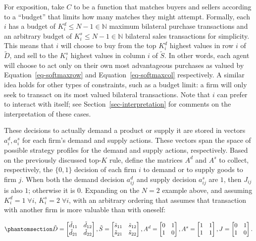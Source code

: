 \documentclass[
]{article}
\theoremstyle{definition}
\theoremstyle{plain}
\theoremstyle{remark}
\begin{document}
For exposition, take \(C\) to be a function that matches buyers and
sellers according to a ``budget'' that limits how many matches they
might attempt. Formally, each \(i\) has a budget of
\(K_i^d \leq N-1 \in \mathbb{N}\) maximum bilateral purchase
transactions and an arbitrary budget of
\(K_i^s \leq N-1 \in \mathbb{N}\) bilateral sales transactions for
simplicity. This means that \(i\) will choose to buy from the top
\(K_i^d\) highest values in row \(i\) of \(\tilde{D}\), and sell to the
\(K_i^s\) highest values in column \(i\) of \(\tilde{S}\). In other
words, each agent will choose to act only on their own most advantageous
purchases as valued by Equation~\ref{eq-softmaxrow} and
Equation~\ref{eq-softmaxcol} respectively. A similar idea holds for
other types of constraints, such as a budget limit: a firm will only
seek to transact on its most valued bilateral transactions. Note that
\(i\) can prefer to interact with itself; see
Section~\ref{sec-interpretation} for comments on the interpretation of
these cases.

These decisions to actually demand a product or supply it are stored in
vectors \(a_i^d, a_i^s\) for each firm's demand and supply actions.
These vectors span the space of possible strategy profiles for the
demand and supply actions, respectively. Based on the previously
discussed top-\(K\) rule, define the matrices \(A^d\) and \(A^s\) to
collect, respectively, the \(\{0, 1\}\) decision of each firm \(i\) to
demand or to supply goods to firm \(j\). When both the demand decision
\(a_{ij}^d\) and supply decision \(a_{ij}^s\) are \(1\), then \(J_{ij}\)
is also \(1\); otherwise it is \(0\). Expanding on the \(N=2\) example
above, and assuming \(K_i^d=1 \; \forall i\), \(K_i^s=2 \; \forall i\),
with an arbitrary ordering that assumes that transaction with another
firm is more valuable than with oneself:

\begin{equation}\phantomsection\label{eq-ntwoexample}{
\tilde{D} = 
\begin{bmatrix}
\tilde{d}_{11} & \tilde{d}_{12} \\
\tilde{d}_{21} & \tilde{d}_{22}
\end{bmatrix}
,
\tilde{S} = 
\begin{bmatrix}
\tilde{s}_{11} & \tilde{s}_{12} \\
\tilde{s}_{21} & \tilde{s}_{22}
\end{bmatrix}
,
A^d = 
\begin{bmatrix}
0 & 1 \\
1 & 0
\end{bmatrix}
,
A^s = 
\begin{bmatrix}
1 & 1 \\
1 & 1
\end{bmatrix}
,
J = 
\begin{bmatrix}
0 & 1 \\
1 & 0
\end{bmatrix}.
}\end{equation}
\end{document}
